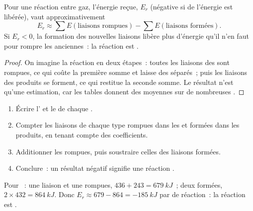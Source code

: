 \begin{proposition}\label{prop:g11:reaction-energy:estimate}
Pour une réaction entre gaz, l'énergie reçue, $E_r$ (négative si de
l'énergie est libérée), vaut approximativement
\[
  E_r \approx \sum E(\text{liaisons rompues}) - \sum E(\text{liaisons formées}) .
\]
Si $E_r < 0$, la formation des nouvelles liaisons libère plus d'énergie
qu'il n'en faut pour rompre les anciennes~: la réaction est
.
\end{proposition}

\begin{proof}
On imagine la réaction en deux étapes~: toutes les liaisons des 
sont rompues, ce qui coûte la première somme et laisse des 
séparés~; puis les liaisons des produits se forment, ce qui restitue la
seconde somme. Le résultat n'est qu'une estimation, car les tables
donnent des moyennes sur de nombreuses .
\end{proof}

\begin{method}\label{met:g11:reaction-energy:bonds}
\begin{enumerate}
  \item Écrire l' et le  de chaque
        .
  \item Compter les liaisons de chaque type rompues dans les  et
        formées dans les produits, en tenant compte des coefficients.
  \item Additionner les  rompues, puis soustraire
        celles des liaisons formées.
  \item Conclure~: un résultat négatif signifie une réaction
        .
\end{enumerate}
\end{method}

\begin{example}\label{ex:g11:reaction-energy:hcl}
Pour ~: une liaison  et une 
rompues, $436 + 243 = \qty{679}{kJ}$~; deux  formées, $2 \times 432 =
\qty{864}{kJ}$. Donc $E_r \approx 679 - 864 = \qty{-185}{kJ}$ par 
de réaction~: la réaction est .
\end{example}


